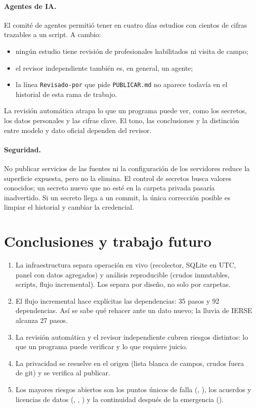 \documentclass{sosg-informe}
\begin{document}
\paragraph{Agentes de IA.} El comité de agentes permitió tener en cuatro días estudios con cientos de cifras trazables a un script. A cambio:
\begin{itemize}
  \item ningún estudio tiene revisión de profesionales habilitados ni visita de campo;
  \item el revisor independiente también es, en general, un agente;
  \item la línea \texttt{Revisado-por} que pide \texttt{PUBLICAR.md} no aparece todavía en el historial de esta rama de trabajo.
\end{itemize}
La revisión automática atrapa lo que un programa puede ver, como los secretos, los datos personales y las cifras clave. El tono, las conclusiones y la distinción entre modelo y dato oficial dependen del revisor.

\paragraph{Seguridad.} No publicar servicios de las fuentes ni la configuración de los servidores reduce la superficie expuesta, pero no la elimina. El control de secretos busca valores conocidos; un secreto nuevo que no esté en la carpeta privada pasaría inadvertido. Si un secreto llega a un commit, la única corrección posible es limpiar el historial y cambiar la credencial.

\section{Conclusiones y trabajo futuro}
\begin{enumerate}
  \item La infraestructura separa operación en vivo (recolector, SQLite en UTC, panel con datos agregados) y análisis reproducible (crudos inmutables, scripts, flujo incremental). Los separa por diseño, no solo por carpetas.
  \item El flujo incremental hace explícitas las dependencias: 35 pasos y 92 dependencias. Así se sabe qué rehacer ante un dato nuevo; la lluvia de IERSE alcanza 27 pasos.
  \item La revisión automática y el revisor independiente cubren riesgos distintos: lo que un programa puede verificar y lo que requiere juicio.
  \item La privacidad se resuelve en el origen (lista blanca de campos, crudos fuera de git) y se verifica al publicar.
  \item Los mayores riesgos abiertos son los puntos únicos de falla (, ), los acuerdos y licencias de datos (, , ) y la continuidad después de la emergencia ().
\end{enumerate}
\end{document}
